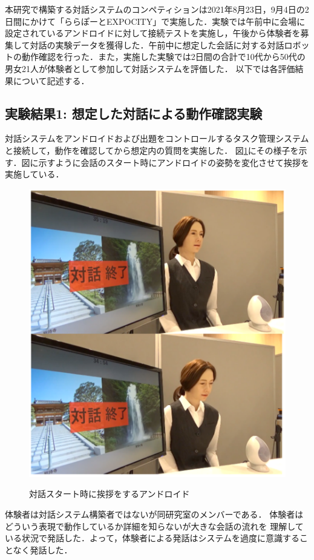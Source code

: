 本研究で構築する対話システムのコンペティションは2021年8月23日，9月4日の2日間にかけて「ららぽーとEXPOCITY」で実施した．実験では午前中に会場に設定されているアンドロイドに対して接続テストを実施し，午後から体験者を募集して対話の実験データを獲得した．午前中に想定した会話に対する対話ロボットの動作確認を行った．また，実施した実験では2日間の合計で10代から50代の男女21人が体験者として参加して対話システムを評価した．
以下では各評価結果について記述する．

\subsection{実験結果1: 想定した対話による動作確認実験}
対話システムをアンドロイドおよび出題をコントロールするタスク管理システムと接続して，動作を確認してから想定内の質問を実施した．
図\ref{fig:android1}にその様子を示す．図に示すように会話のスタート時にアンドロイドの姿勢を変化させて挨拶を実施している．
%
\begin{figure}[h]
        \centering
        \includegraphics[scale=0.4]{pic/android1.pdf}
        \label{fig:android1}
        \caption{対話スタート時に挨拶をするアンドロイド}
\end{figure}
体験者は対話システム構築者ではないが同研究室のメンバーである．
体験者はどういう表現で動作しているか詳細を知らないが大きな会話の流れを
理解している状況で発話した．よって，体験者による発話はシステムを過度に意識することなく発話した．

